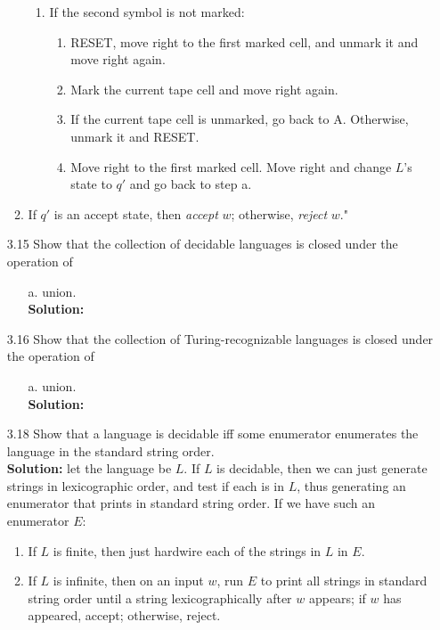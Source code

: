 \begin{enumerate}
\begin{enumerate}
\begin{enumerate}
\item If the second symbol is not marked:
\begin{enumerate}
\item RESET, move right to the first marked cell, and unmark it and move right again.
\item Mark the current tape cell and move right again.
\item If the current tape cell is unmarked, go back to A. Otherwise, unmark it and RESET.
\item Move right to the first marked cell. Move right and change $L$'s state to $q'$ and go back to step a.
\end{enumerate}
\end{enumerate}
\item If $q'$ is an accept state, then \emph{accept} $w$; otherwise, \emph{reject} $w$."
\end{enumerate}

\item[3.15]Show that the collection of decidable languages is closed under the operation of
\begin{enumerate}
\item[a.]union.
\\
\textbf{Solution:} \alreadyanswered
\end{enumerate}

\item[3.16]Show that the collection of Turing-recognizable languages is closed under the operation of
\begin{enumerate}
\item[a.]union.
\\
\textbf{Solution:} \alreadyanswered
\end{enumerate}

\item[3.18]Show that a language is decidable iff some enumerator enumerates the language in the standard string order.
\\
\textbf{Solution:} let the language be $L$. If $L$ is decidable, then we can just generate strings in lexicographic order, and test if each is in $L$, thus generating an enumerator that prints in standard string order. If we have such an enumerator $E$:
\begin{enumerate}
\item If $L$ is finite, then just hardwire each of the strings in $L$ in $E$.
\item If $L$ is infinite, then on an input $w$, run $E$ to print all strings in standard string order until a string lexicographically after $w$ appears; if $w$ has appeared, accept; otherwise, reject.
\end{enumerate}


\end{enumerate}
